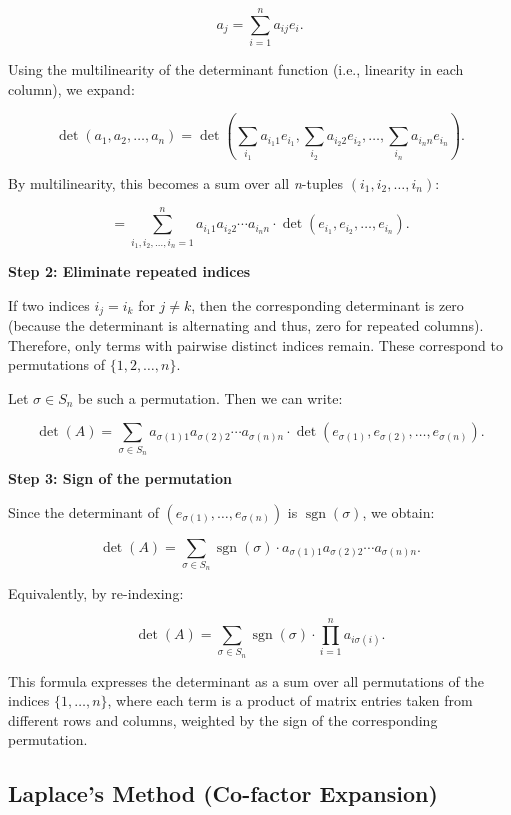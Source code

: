 \[
a_j = \sum_{i=1}^n a_{ij} e_i.
\]

Using the multilinearity of the determinant function (i.e., linearity in each column), we expand:

\[
\det(a_1, a_2, \dots, a_n) = \det\left( \sum_{i_1} a_{i_1 1} e_{i_1}, \sum_{i_2} a_{i_2 2} e_{i_2}, \dots, \sum_{i_n} a_{i_n n} e_{i_n} \right).
\]

By multilinearity, this becomes a sum over all \emph{n}-tuples \( (i_1, i_2, \dots, i_n) \):

\[
= \sum_{i_1, i_2, \dots, i_n = 1}^n a_{i_1 1} a_{i_2 2} \cdots a_{i_n n} \cdot \det(e_{i_1}, e_{i_2}, \dots, e_{i_n}).
\]

\textbf{Step 2: Eliminate repeated indices}

If two indices \( i_j = i_k \) for \( j \neq k \), then the corresponding 
determinant is zero (because the determinant is alternating and thus, zero for repeated columns). 
Therefore, only terms with pairwise distinct indices remain. These correspond to permutations of \( \{1, 2, \dots, n\} \).

Let \( \sigma \in S_n \) be such a permutation. Then we can write:

\[
\det(A) = \sum_{\sigma \in S_n} a_{\sigma(1) 1} a_{\sigma(2) 2} \cdots a_{\sigma(n) n} \cdot \det(e_{\sigma(1)}, e_{\sigma(2)}, \dots, e_{\sigma(n)}).
\]

\textbf{Step 3: Sign of the permutation}

Since the determinant of \( (e_{\sigma(1)}, \dots, e_{\sigma(n)}) \) is \( \operatorname{sgn}(\sigma) \), we obtain:

\[
\det(A) = \sum_{\sigma \in S_n} \operatorname{sgn}(\sigma) \cdot a_{\sigma(1)1} a_{\sigma(2)2} \cdots a_{\sigma(n)n}.
\]

Equivalently, by re-indexing:

\[
\det(A) = \sum_{\sigma \in S_n} \operatorname{sgn}(\sigma) \cdot \prod_{i=1}^n a_{i \sigma(i)}.
\]


This formula expresses the determinant as a sum over all permutations of the indices \( \{1, \dots, n\} \), where each term is a product of matrix entries taken from different rows and columns, weighted by the sign of the corresponding permutation.


\subsection{Laplace's Method (Co-factor Expansion)}

